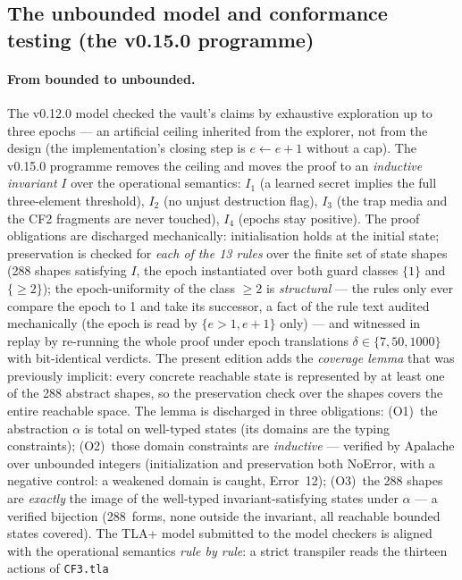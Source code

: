 \documentclass[10pt,a4paper]{article}
\newcommand{\code}[1]{\texttt{\small #1}}
\begin{document}
\subsection{The unbounded model and conformance testing
(the v0.15.0 programme)}\label{sec:v150}

\paragraph{From bounded to unbounded.} The v0.12.0 model checked the
vault's claims by exhaustive exploration up to three epochs --- an
artificial ceiling inherited from the explorer, not from the design (the
implementation's closing step is $e \leftarrow e+1$ without a cap). The
v0.15.0 programme removes the ceiling and moves the proof to an
\emph{inductive invariant} $I$ over the operational semantics:
$I_1$ (a learned secret implies the full three-element threshold),
$I_2$ (no unjust destruction flag), $I_3$ (the trap media and the CF2
fragments are never touched), $I_4$ (epochs stay positive). The proof
obligations are discharged mechanically: initialisation holds at the
initial state; preservation is checked for \emph{each of the 13 rules}
over the finite set of state shapes (288 shapes satisfying $I$, the
epoch instantiated over both guard classes $\{1\}$ and $\{\ge 2\}$); the
epoch-uniformity of the class $\ge 2$ is \emph{structural} --- the
rules only ever compare the epoch to 1 and take its successor, a fact
of the rule text audited mechanically (the epoch is read by
$\{e > 1, e + 1\}$ only) --- and witnessed in replay by re-running the
whole proof under epoch translations $\delta \in \{7, 50, 1000\}$ with
bit-identical verdicts. The present edition adds the \emph{coverage
lemma} that was previously implicit: every concrete reachable state is
represented by at least one of the 288 abstract shapes, so the
preservation check over the shapes covers the entire reachable space.
The lemma is discharged in three obligations: (O1)~the abstraction
$\alpha$ is total on well-typed states (its domains are the typing
constraints); (O2)~those domain constraints are \emph{inductive} ---
verified by Apalache over unbounded integers (initialization and
preservation both NoError, with a negative control: a weakened domain
is caught, Error~12); (O3)~the 288 shapes are \emph{exactly} the image
of the well-typed invariant-satisfying states under $\alpha$ --- a
verified bijection (288~forms, none outside the invariant, all
reachable bounded states covered). The TLA+ model submitted to the
model checkers is aligned with the operational semantics \emph{rule by
rule}: a strict transpiler reads the thirteen actions of \code{CF3.tla}
\end{document}
